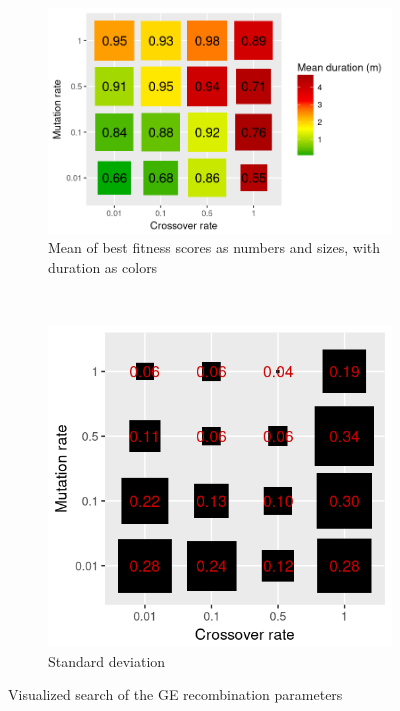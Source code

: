 \begin{figure}
    \centering
    \begin{subfigure}{0.57\textwidth}
        \includegraphics[width=\textwidth]{figures/ge-recombination-sampling}
        \caption{Mean of best fitness scores as numbers and sizes, with duration as colors}
        \label{fig:recombination-sampling}
    \end{subfigure}
    ~
    \begin{subfigure}{0.4\textwidth}
        \includegraphics[width=\textwidth]{figures/ge-recombination-sampling-variance}
        \caption{Standard deviation}
        \label{fig:recombination-sampling-variance}
    \end{subfigure}
    \caption[Visualized search of the GE recombination parameters]{Visualized search of the \gls{GE} recombination parameters}
\end{figure}

